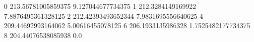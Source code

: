 0 213.56781005859375 9.127044677734375
1 212.3284149169922 7.8876495361328125
2 212.42393493652344 7.9831695556640625
4 209.44692993164062 5.00616455078125
6 206.1933135986328 1.7525482177734375
8 204.44076538085938 0.0
